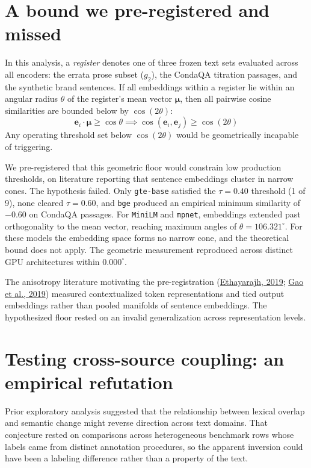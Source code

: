 \documentclass[11pt]{article}
\begin{document}
\section{A bound we pre-registered and missed}

In this analysis, a \emph{register} denotes one of three frozen text sets evaluated across all encoders: the errata prose subset ($g_2$), the CondaQA titration passages, and the synthetic brand sentences. If all embeddings within a register lie within an angular radius $\theta$ of the register's mean vector $\boldsymbol{\mu}$, then all pairwise cosine similarities are bounded below by $\cos(2\theta)$:
\[
\mathbf{e}_i \cdot \boldsymbol{\mu} \ge \cos \theta \implies \cos(\mathbf{e}_i, \mathbf{e}_j) \ge \cos(2\theta)
\]
Any operating threshold set below $\cos(2\theta)$ would be geometrically incapable of triggering.

We pre-registered that this geometric floor would constrain low production thresholds, on literature reporting that sentence embeddings cluster in narrow cones. The hypothesis failed. Only \texttt{gte-base} satisfied the $\tau = 0.40$ threshold (1 of 9), none cleared $\tau = 0.60$, and \texttt{bge} produced an empirical minimum similarity of $-0.60$ on CondaQA passages. For \texttt{MiniLM} and \texttt{mpnet}, embeddings extended past orthogonality to the mean vector, reaching maximum angles of $\theta = 106.321^\circ$. For these models the embedding space forms no narrow cone, and the theoretical bound does not apply. The geometric measurement reproduced across distinct GPU architectures within $0.000^\circ$.

The anisotropy literature motivating the pre-registration (\hyperlink{bib:ethayarajh}{Ethayarajh, 2019}; \hyperlink{bib:gao}{Gao et al., 2019}) measured contextualized token representations and tied output embeddings rather than pooled manifolds of sentence embeddings. The hypothesized floor rested on an invalid generalization across representation levels.

\section{Testing cross-source coupling: an empirical refutation}

Prior exploratory analysis suggested that the relationship between lexical overlap and semantic change might reverse direction across text domains. That conjecture rested on comparisons across heterogeneous benchmark rows whose labels came from distinct annotation procedures, so the apparent inversion could have been a labeling difference rather than a property of the text.
\end{document}
